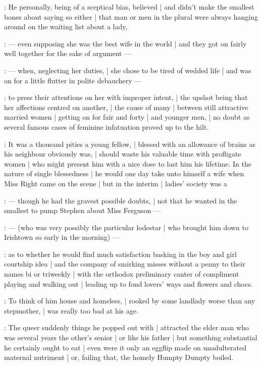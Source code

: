:
He personally, being of a sceptical bias, believed |
and didn't make the smallest bones about saying so either |
that man or men in the plural were always hanging around on the waiting list about a lady,

:
    --- even supposing she was the best wife in the world |
        and they got on fairly well together for the sake of argument ---

:
    --- when, neglecting her duties, |
        she chose to be tired of wedded life |
        and was on for a little flutter in polite debauchery ---

:
to press their attentions on her with improper intent, |
the upshot being that her affections centred on another, |
the cause of many  |
between still attractive married women |
getting on for fair and forty |
and younger men, |
no doubt as several famous cases of feminine infatuation proved up to the hilt.

:
It was a thousand pities a young fellow, |
blessed with an allowance of brains as his neighbour obviously was, |
should waste his valuable time with profligate women |
who might present him with a nice dose to last him his lifetime.
In the nature of single blessedness |
he would one day take unto himself a wife when Miss Right came on the scene |
but in the interim |
ladies' society was a 

:
    --- though he had the gravest possible doubts, |
        not that he wanted in the smallest to pump Stephen about Miss Ferguson ---

:
    --- (who was very possibly the particular lodestar |
        who brought him down to Irishtown so early in the morning) ---

:
as to whether he would find much satisfaction basking in the boy and girl courtship idea |
and the company of smirking misses without a penny to their names bi or triweekly |
with the orthodox preliminary canter of compliment playing and walking out |
leading up to fond lovers' ways and flowers and chocs.

:
To think of him house and homeless, |
rooked by some landlady worse than any stepmother, |
was really too bad at his age.

:
The queer suddenly things he popped out with |
attracted the elder man who was several years the other's senior |
or like his father |
but something substantial he certainly ought to eat |
even were it only an eggflip made on unadulterated maternal nutriment |
or, failing that, the homely Humpty Dumpty boiled.

